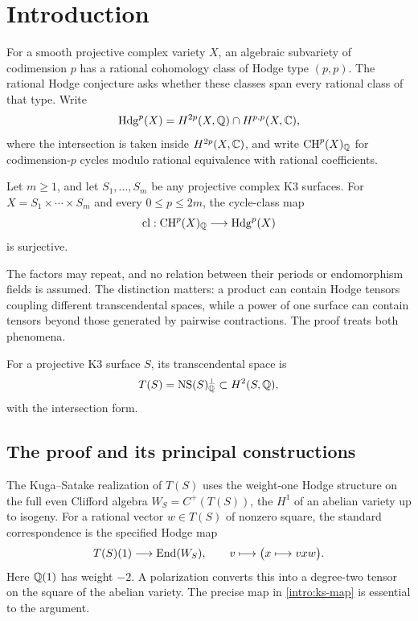 \section{Introduction}\label{sec:introduction}

For a smooth projective complex variety \(X\), an algebraic subvariety
of codimension \(p\) has a rational cohomology class of Hodge type
\((p,p)\).  The rational Hodge conjecture asks whether these classes
span every rational class of that type.  Write
\[
 \mathrm{Hdg}^p(X)=H^{2p}(X,\mathbb Q)\cap H^{p,p}(X,\mathbb C),
\]
where the intersection is taken inside \(H^{2p}(X,\mathbb C)\), and write
\(\operatorname{CH}^p(X)_\mathbb Q\) for codimension-\(p\) cycles modulo rational
equivalence with rational coefficients.

\begin{theorem}\label{thm:main}
Let \(m\ge1\), and let \(S_1,\ldots,S_m\) be any projective complex
K3 surfaces.  For \(X=S_1\times\cdots\times S_m\) and every
\(0\le p\le2m\), the cycle-class map
\[
 \operatorname{cl}:\operatorname{CH}^p(X)_\mathbb Q\longrightarrow\mathrm{Hdg}^p(X)
\]
is surjective.
\end{theorem}

The factors may repeat, and no relation between their periods or
endomorphism fields is assumed.  The distinction matters: a product
can contain Hodge tensors coupling different transcendental spaces,
while a power of one surface can contain tensors beyond those generated
by pairwise contractions.  The proof treats both phenomena.

For a projective K3 surface \(S\), its transcendental space is
\[
 T(S)=\operatorname{NS}(S)_\mathbb Q^\perp\subset H^2(S,\mathbb Q),
\]
with the intersection form.  



\subsection{The proof and its principal constructions}

The Kuga--Satake realization of \(T(S)\) uses the
weight-one Hodge structure on the full even Clifford algebra
\(W_S=C^+(T(S))\), the \(H^1\) of an abelian variety up to isogeny.
For a rational vector \(w\in T(S)\) of nonzero square, the standard
correspondence is the specified Hodge map
\begin{equation}\label{intro:ks-map}
 T(S)(1)\longrightarrow\operatorname{End}(W_S),\qquad
 v\longmapsto\bigl(x\longmapsto vxw\bigr).
\end{equation}
Here \(\mathbb Q(1)\) has weight \(-2\).  A polarization converts this into
a degree-two tensor on the square of the abelian variety.
The precise map in \eqref{intro:ks-map} is essential to the argument.

